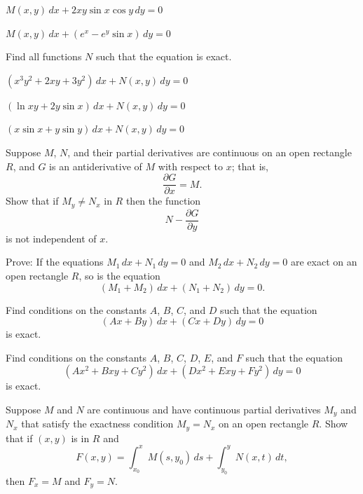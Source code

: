 \begin{exerciselist}
\begin{alist}
    \item %
    $M(x,y)\,dx+2xy\sin x\cos y\,dy=0$

    \item %
    $M(x,y)\,dx+(e^{x}-e^{y}\sin x)\,dy=0$
  \end{alist}

  \item\label{exer:2.5.30} Find all functions $N$ such that the equation is exact.
  \begin{alist}
    \item %
    $(x^{3}y^{2}+2xy+3y^{2})\,dx+N(x,y)\,dy=0$

    \item %
    $(\ln xy+2y\sin x)\,dx+N(x,y)\,dy=0$

    \item %
    $(x\sin x+y\sin y)\,dx+N(x,y)\,dy=0$
  \end{alist}

  \item\label{exer:2.5.31} Suppose $M$, $N$, and their partial derivatives are continuous on an open
        rectangle $R$, and $G$ is an antiderivative of $M$ with respect to $x$; that is,
  \[
    \frac{\partial G}{\partial x}=M.
  \]
  Show that if $M_{y}\ne N_{x}$ in $R$ then the function
  \[
    N-\frac{\partial G}{\partial y}
  \]
  is not independent of $x$.

  \item\label{exer:2.5.32} Prove: If the equations $M_{1}\,dx+N_{1}\,dy=0$ and
        $M_{2}\, dx+N_{2}\,dy=0$ are exact on an open rectangle $R$, so is the equation
  \[
    (M_{1}+M_{2})\,dx+(N_{1}+N_{2})\,dy=0.
  \]

  \item\label{exer:2.5.33} Find conditions on the constants $A$, $B$, $C$, and $D$ such that the
        equation
  \[
    (Ax+By)\,dx+(Cx+Dy)\,dy=0
  \]
  is exact.

  \item\label{exer:2.5.34} Find conditions on the constants $A$, $B$, $C$, $D$, $E$, and $F$ such
        that the equation
  \[
    (Ax^{2}+Bxy+Cy^{2})\,dx+(Dx^{2}+Exy+Fy^{2})\,dy=0
  \]
  is exact.

  \item\label{exer:2.5.35} Suppose $M$ and $N$ are continuous and have continuous partial
        derivatives $M_{y}$ and $N_{x}$ that satisfy the exactness condition $M_{y}=N_{x}$ on an
        open rectangle $R$. Show that if $(x,y)$ is in $R$ and
  \[
    F(x,y)=\int^{x}_{x_{0}}M(s,y_{0})\,ds+\int^{y}_{y_{0}}N(x,t)\,dt,
  \]
  then $F_{x}=M$ and $F_{y}=N$.


\end{exerciselist}
